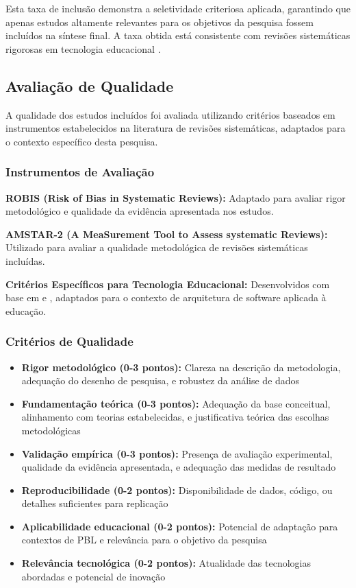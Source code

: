 \documentclass[english, spanish, brazilian]{RBIEarticle} %
\begin{document}
Esta taxa de inclusão demonstra a seletividade criteriosa aplicada, garantindo que apenas estudos altamente relevantes para os objetivos da pesquisa fossem incluídos na síntese final. A taxa obtida está consistente com revisões sistemáticas rigorosas em tecnologia educacional \parencite{Gough2017}.

\subsection{Avaliação de Qualidade}

A qualidade dos estudos incluídos foi avaliada utilizando critérios baseados em instrumentos estabelecidos na literatura de revisões sistemáticas, adaptados para o contexto específico desta pesquisa.

\subsubsection{Instrumentos de Avaliação}

\textbf{ROBIS (Risk of Bias in Systematic Reviews):} Adaptado para avaliar rigor metodológico e qualidade da evidência apresentada nos estudos.

\textbf{AMSTAR-2 (A MeaSurement Tool to Assess systematic Reviews):} Utilizado para avaliar a qualidade metodológica de revisões sistemáticas incluídas.

\textbf{Critérios Específicos para Tecnologia Educacional:} Desenvolvidos com base em \textcite{Whiting2016} e \textcite{Shea2007}, adaptados para o contexto de arquitetura de software aplicada à educação.

\subsubsection{Critérios de Qualidade}

\begin{itemize}
\item \textbf{Rigor metodológico (0-3 pontos):} Clareza na descrição da metodologia, adequação do desenho de pesquisa, e robustez da análise de dados
\item \textbf{Fundamentação teórica (0-3 pontos):} Adequação da base conceitual, alinhamento com teorias estabelecidas, e justificativa teórica das escolhas metodológicas
\item \textbf{Validação empírica (0-3 pontos):} Presença de avaliação experimental, qualidade da evidência apresentada, e adequação das medidas de resultado
\item \textbf{Reproducibilidade (0-2 pontos):} Disponibilidade de dados, código, ou detalhes suficientes para replicação
\item \textbf{Aplicabilidade educacional (0-2 pontos):} Potencial de adaptação para contextos de PBL e relevância para o objetivo da pesquisa
\item \textbf{Relevância tecnológica (0-2 pontos):} Atualidade das tecnologias abordadas e potencial de inovação
\end{itemize}
\end{document}
